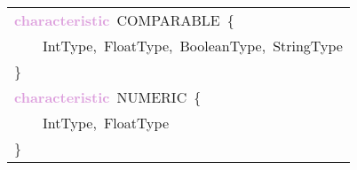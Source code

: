 \begin{tabular}[t]{l}
\noindent
\mbox{}\textbf{\textcolor{Plum}{characteristic}}\ COMPARABLE\ \{ \\
\mbox{}\ \ \ \ IntType,\ FloatType,\ BooleanType,\ StringType \\
\mbox{}\}\ \  \\
\mbox{}\textbf{\textcolor{Plum}{characteristic}}\ NUMERIC\ \{ \\
\mbox{}\ \ \ \ IntType,\ FloatType \\
\mbox{}\}\ 
\end{tabular}
